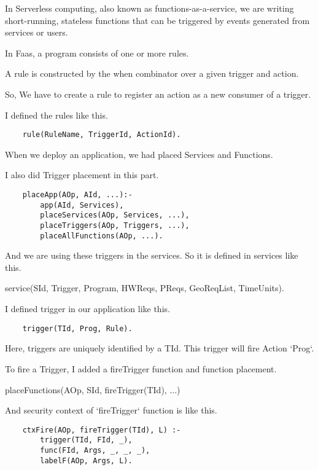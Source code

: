 \documentclass[../DraftNotes.tex]{subfiles}
\begin{document}
In Serverless computing, also known as functions-as-a-service, we are writing short-running, stateless functions that can be triggered by events generated from services or users.

In Faas, a program consists of one or more rules. 

A rule is constructed by the when combinator over a given trigger and action.

So, We have to create a rule to register an action as a new consumer of a trigger.

I defined the rules like this.
    
\begin{verbatim}
    rule(RuleName, TriggerId, ActionId).
\end{verbatim}

When we deploy an application, we had placed Services and Functions. 

I also did Trigger placement in this part. 

\begin{verbatim}
    placeApp(AOp, AId, ...):-
        app(AId, Services),
        placeServices(AOp, Services, ...),
        placeTriggers(AOp, Triggers, ...),
        placeAllFunctions(AOp, ...).
\end{verbatim}

And we are using these triggers in the services. So it is defined in services like this.

    service(SId, Trigger, Program, HWReqs, PReqs, GeoReqList, TimeUnits).


I defined trigger in our application like this.

\begin{verbatim}
    trigger(TId, Prog, Rule).
\end{verbatim}

Here, triggers are uniquely identified by a TId. This trigger will fire Action `Prog`.


To fire a Trigger, I added a fireTrigger function and function placement.

    placeFunctions(AOp, SId, fireTrigger(TId), ...)

And security context of `fireTrigger` function is like this.

\begin{verbatim}
	ctxFire(AOp, fireTrigger(TId), L) :-
        trigger(TId, FId, _),
        func(FId, Args, _, _, _),
        labelF(AOp, Args, L). 
\end{verbatim}
\end{document}

